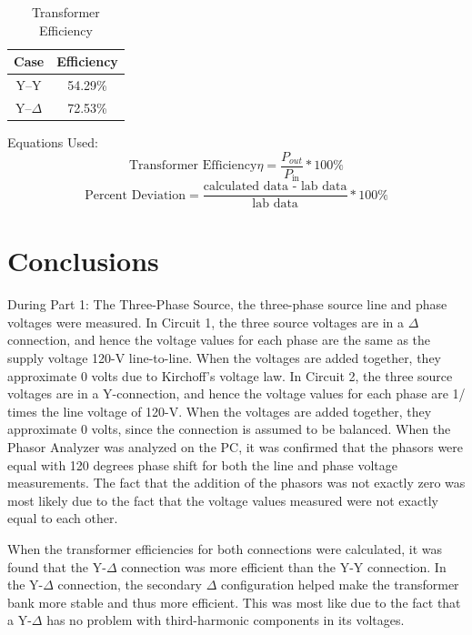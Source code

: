 \documentclass{article}
\begin{document}
\begin{table}[H]
  \centering
  \begin{tabular}{*{2}{c}}
    \textbf{Case} & \textbf{Efficiency} \\

    \hline

    Y--Y        & 54.29\% \\
    Y--$\Delta$ & 72.53\% \\
  \end{tabular}
  \caption{Transformer Efficiency}
  \label{tab:efficiency}
\end{table}



Equations Used:
\[\text{Transformer Efficiency}\eta = \frac{P_{out}}{P_\text{in}} * 100\% \]
\[\text{Percent Deviation} = \frac{\text{calculated data - lab data}}{\text{lab data}} * 100\%\]

\section{Conclusions}
During Part 1: The Three-Phase Source, the three-phase source line and phase voltages were 
measured. In Circuit 1, the three source voltages are in a $\Delta$ connection, and hence the
voltage values for each phase are the same as the supply voltage 120-V line-to-line. When the 
voltages are added together, they approximate 0 volts due to Kirchoff's voltage law. In Circuit
2, the three source voltages are in a Y-connection, and hence the voltage values for each phase
are 1/ times the line voltage of 120-V. When the voltages are added together, they 
approximate 0 volts, since the connection is assumed to be balanced. When the Phasor Analyzer was
analyzed on the PC, it was confirmed that the phasors were equal with 120 degrees phase shift
for both the line and phase voltage measurements. The fact that the addition of the phasors
was not exactly zero was most likely due to the fact that the voltage values measured were not 
exactly equal to each other.

When the transformer efficiencies for both connections were calculated, it was found that 
the Y-$\Delta$ connection was more efficient than the Y-Y connection. In the Y-$\Delta$ 
connection, the secondary $\Delta$ configuration helped make the transformer bank more 
stable and thus more efficient. This was most like due to the fact that a Y-$\Delta$ 
has no problem with third-harmonic components in its voltages.
\end{document}
